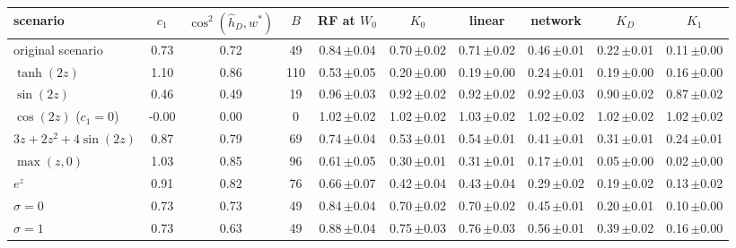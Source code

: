 \begin{tabular}{lccc|ccc|ccc}
\toprule
scenario & $c_1$ & $\cos^2(\hat h_D,w^*)$ & $B$ & RF at $W_0$ & $K_0$ & linear & network & $K_D$ & $K_1$ \\
\midrule
original scenario & 0.73 & 0.72 & 49 & 0.84\,{\scriptsize$\pm$0.04} & 0.70\,{\scriptsize$\pm$0.02} & 0.71\,{\scriptsize$\pm$0.02} & 0.46\,{\scriptsize$\pm$0.01} & 0.22\,{\scriptsize$\pm$0.01} & 0.11\,{\scriptsize$\pm$0.00} \\
\midrule
$\tanh(2z)$ & 1.10 & 0.86 & 110 & 0.53\,{\scriptsize$\pm$0.05} & 0.20\,{\scriptsize$\pm$0.00} & 0.19\,{\scriptsize$\pm$0.00} & 0.24\,{\scriptsize$\pm$0.01} & 0.19\,{\scriptsize$\pm$0.00} & 0.16\,{\scriptsize$\pm$0.00} \\
$\sin(2z)$ & 0.46 & 0.49 & 19 & 0.96\,{\scriptsize$\pm$0.03} & 0.92\,{\scriptsize$\pm$0.02} & 0.92\,{\scriptsize$\pm$0.02} & 0.92\,{\scriptsize$\pm$0.03} & 0.90\,{\scriptsize$\pm$0.02} & 0.87\,{\scriptsize$\pm$0.02} \\
$\cos(2z)$ ($c_1=0$) & -0.00 & 0.00 & 0 & 1.02\,{\scriptsize$\pm$0.02} & 1.02\,{\scriptsize$\pm$0.02} & 1.03\,{\scriptsize$\pm$0.02} & 1.02\,{\scriptsize$\pm$0.02} & 1.02\,{\scriptsize$\pm$0.02} & 1.02\,{\scriptsize$\pm$0.02} \\
\midrule
$3z+2z^2+4\sin(2z)$ & 0.87 & 0.79 & 69 & 0.74\,{\scriptsize$\pm$0.04} & 0.53\,{\scriptsize$\pm$0.01} & 0.54\,{\scriptsize$\pm$0.01} & 0.41\,{\scriptsize$\pm$0.01} & 0.31\,{\scriptsize$\pm$0.01} & 0.24\,{\scriptsize$\pm$0.01} \\
$\max(z,0)$ & 1.03 & 0.85 & 96 & 0.61\,{\scriptsize$\pm$0.05} & 0.30\,{\scriptsize$\pm$0.01} & 0.31\,{\scriptsize$\pm$0.01} & 0.17\,{\scriptsize$\pm$0.01} & 0.05\,{\scriptsize$\pm$0.00} & 0.02\,{\scriptsize$\pm$0.00} \\
$e^{z}$ & 0.91 & 0.82 & 76 & 0.66\,{\scriptsize$\pm$0.07} & 0.42\,{\scriptsize$\pm$0.04} & 0.43\,{\scriptsize$\pm$0.04} & 0.29\,{\scriptsize$\pm$0.02} & 0.19\,{\scriptsize$\pm$0.02} & 0.13\,{\scriptsize$\pm$0.02} \\
\midrule
$\sigma=0$ & 0.73 & 0.73 & 49 & 0.84\,{\scriptsize$\pm$0.04} & 0.70\,{\scriptsize$\pm$0.02} & 0.70\,{\scriptsize$\pm$0.02} & 0.45\,{\scriptsize$\pm$0.01} & 0.20\,{\scriptsize$\pm$0.01} & 0.10\,{\scriptsize$\pm$0.00} \\
$\sigma=1$ & 0.73 & 0.63 & 49 & 0.88\,{\scriptsize$\pm$0.04} & 0.75\,{\scriptsize$\pm$0.03} & 0.76\,{\scriptsize$\pm$0.03} & 0.56\,{\scriptsize$\pm$0.01} & 0.39\,{\scriptsize$\pm$0.02} & 0.16\,{\scriptsize$\pm$0.00} \\

\end{tabular}
